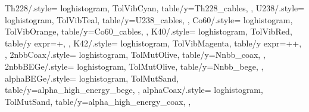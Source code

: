 {  Th228/.style={%
    loghistogram,
    TolVibCyan,
    table/y=Th228_cables,
  },
  U238/.style={%
    loghistogram,
    TolVibTeal,
    table/y=U238_cables,
  },
  Co60/.style={%
    loghistogram,
    TolVibOrange,
    table/y=Co60_cables,
  },
  K40/.style={%
    loghistogram,
    TolVibRed,
    table/y expr=+,
  },
  K42/.style={%
    loghistogram,
    TolVibMagenta,
    table/y expr=++,
  },
  2nbbCoax/.style={%
    loghistogram,
    TolMutOlive,
    table/y=Nnbb_coax,
  },
  2nbbBEGe/.style={%
    loghistogram,
    TolMutOlive,
    table/y=Nnbb_bege,
  },
  alphaBEGe/.style={%
    loghistogram,
    TolMutSand,
    table/y=alpha_high_energy_bege,
  },
  alphaCoax/.style={%
    loghistogram,
    TolMutSand,
    table/y=alpha_high_energy_coax,
  },
}

\newcommand{\addbrasilianplot}{%
  \addplot[3sigu] table {\loadedtable};
  \addplot[3sigl] table {\loadedtable};
  \addplot[3sigb] fill between [of=3sigu and 3sigl];
  \addplot[2sigu] table {\loadedtable};
  \addplot[2sigl] table {\loadedtable};
  \addplot[2sigb] fill between [of=2sigu and 2sigl];
  \addplot[1sigu] table {\loadedtable};
  \addplot[1sigl] table {\loadedtable};
  \addplot[1sigb] fill between [of=1sigu and 1sigl];
  \addplot[ratio] table {\loadedtable};
}
